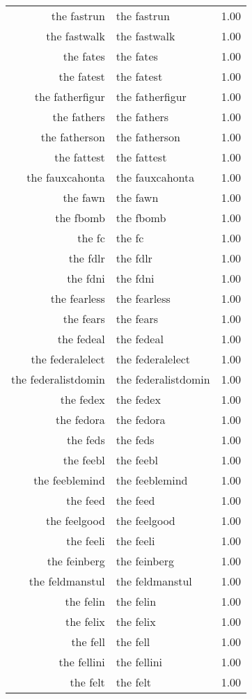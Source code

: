 \begin{table}[ht]
\begin{tabular}{rlr}
  the fastrun & the fastrun & 1.00 \\ 
  the fastwalk & the fastwalk & 1.00 \\ 
  the fates & the fates & 1.00 \\ 
  the fatest & the fatest & 1.00 \\ 
  the fatherfigur & the fatherfigur & 1.00 \\ 
  the fathers & the fathers & 1.00 \\ 
  the fatherson & the fatherson & 1.00 \\ 
  the fattest & the fattest & 1.00 \\ 
  the fauxcahonta & the fauxcahonta & 1.00 \\ 
  the fawn & the fawn & 1.00 \\ 
  the fbomb & the fbomb & 1.00 \\ 
  the fc & the fc & 1.00 \\ 
  the fdlr & the fdlr & 1.00 \\ 
  the fdni & the fdni & 1.00 \\ 
  the fearless & the fearless & 1.00 \\ 
  the fears & the fears & 1.00 \\ 
  the fedeal & the fedeal & 1.00 \\ 
  the federalelect & the federalelect & 1.00 \\ 
  the federalistdomin & the federalistdomin & 1.00 \\ 
  the fedex & the fedex & 1.00 \\ 
  the fedora & the fedora & 1.00 \\ 
  the feds & the feds & 1.00 \\ 
  the feebl & the feebl & 1.00 \\ 
  the feeblemind & the feeblemind & 1.00 \\ 
  the feed & the feed & 1.00 \\ 
  the feelgood & the feelgood & 1.00 \\ 
  the feeli & the feeli & 1.00 \\ 
  the feinberg & the feinberg & 1.00 \\ 
  the feldmanstul & the feldmanstul & 1.00 \\ 
  the felin & the felin & 1.00 \\ 
  the felix & the felix & 1.00 \\ 
  the fell & the fell & 1.00 \\ 
  the fellini & the fellini & 1.00 \\ 
  the felt & the felt & 1.00 \\ 

\end{tabular}
\end{table}
